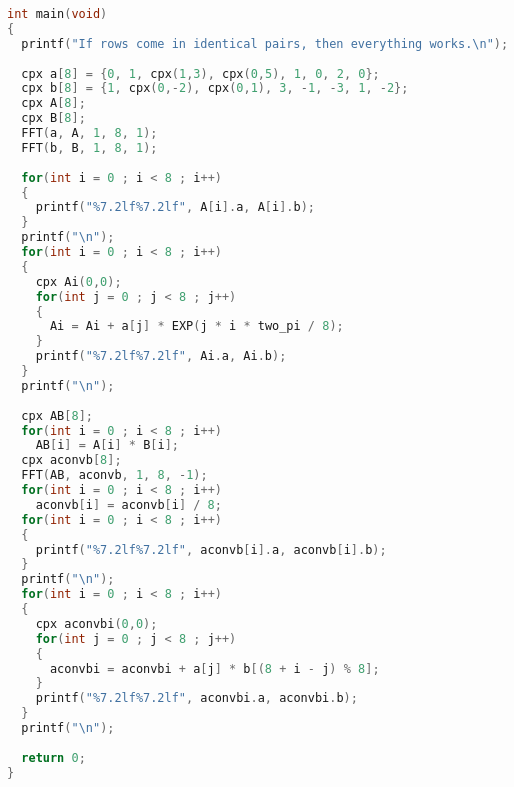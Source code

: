 \begin{lstlisting}[language=C++]
int main(void)
{
  printf("If rows come in identical pairs, then everything works.\n");
  
  cpx a[8] = {0, 1, cpx(1,3), cpx(0,5), 1, 0, 2, 0};
  cpx b[8] = {1, cpx(0,-2), cpx(0,1), 3, -1, -3, 1, -2};
  cpx A[8];
  cpx B[8];
  FFT(a, A, 1, 8, 1);
  FFT(b, B, 1, 8, 1);
  
  for(int i = 0 ; i < 8 ; i++)
  {
    printf("%7.2lf%7.2lf", A[i].a, A[i].b);
  }
  printf("\n");
  for(int i = 0 ; i < 8 ; i++)
  {
    cpx Ai(0,0);
    for(int j = 0 ; j < 8 ; j++)
    {
      Ai = Ai + a[j] * EXP(j * i * two_pi / 8);
    }
    printf("%7.2lf%7.2lf", Ai.a, Ai.b);
  }
  printf("\n");
  
  cpx AB[8];
  for(int i = 0 ; i < 8 ; i++)
    AB[i] = A[i] * B[i];
  cpx aconvb[8];
  FFT(AB, aconvb, 1, 8, -1);
  for(int i = 0 ; i < 8 ; i++)
    aconvb[i] = aconvb[i] / 8;
  for(int i = 0 ; i < 8 ; i++)
  {
    printf("%7.2lf%7.2lf", aconvb[i].a, aconvb[i].b);
  }
  printf("\n");
  for(int i = 0 ; i < 8 ; i++)
  {
    cpx aconvbi(0,0);
    for(int j = 0 ; j < 8 ; j++)
    {
      aconvbi = aconvbi + a[j] * b[(8 + i - j) % 8];
    }
    printf("%7.2lf%7.2lf", aconvbi.a, aconvbi.b);
  }
  printf("\n");
  
  return 0;
}

\end{lstlisting}

